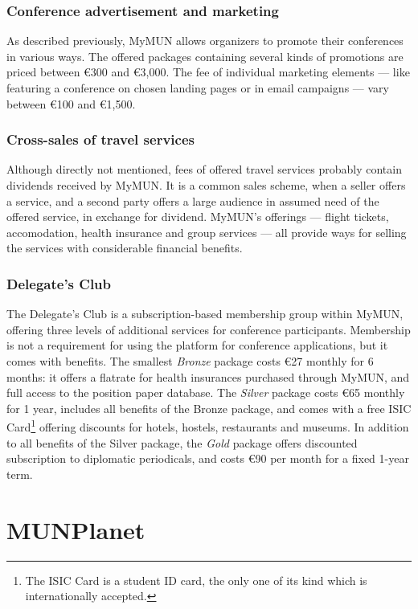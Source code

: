 \subsubsection{Conference advertisement and marketing}

As described previously, MyMUN allows organizers to promote their conferences in various ways. The offered packages containing several kinds of promotions are priced between €300 and €3,000. The fee of individual marketing elements — like featuring a conference on chosen landing pages or in email campaigns — vary between €100 and €1,500.

\subsubsection{Cross-sales of travel services}

Although directly not mentioned, fees of offered travel services probably contain dividends received by MyMUN. It is a common sales scheme, when a seller offers a service, and a second party offers a large audience in assumed need of the offered service, in exchange for dividend. MyMUN's offerings — flight tickets, accomodation, health insurance and group services — all provide ways for selling the services with considerable financial benefits.

\subsubsection{Delegate's Club}

The Delegate's Club is a subscription-based membership group within MyMUN, offering three levels of additional services for conference participants. Membership is not a requirement for using the platform for conference applications, but it comes with benefits. The smallest \emph{Bronze} package costs €27 monthly for 6 months: it offers a flatrate for health insurances purchased through MyMUN, and full access to the position paper database. The \emph{Silver} package costs €65 monthly for 1 year, includes all benefits of the Bronze package, and comes with a free ISIC Card\footnote{The ISIC Card is a student ID card, the only one of its kind which is internationally accepted.} offering discounts for hotels, hostels, restaurants and museums. In addition to all benefits of the Silver package, the \emph{Gold} package offers discounted subscription to diplomatic periodicals, and costs €90 per month for a fixed 1-year term.

\section{MUNPlanet}

